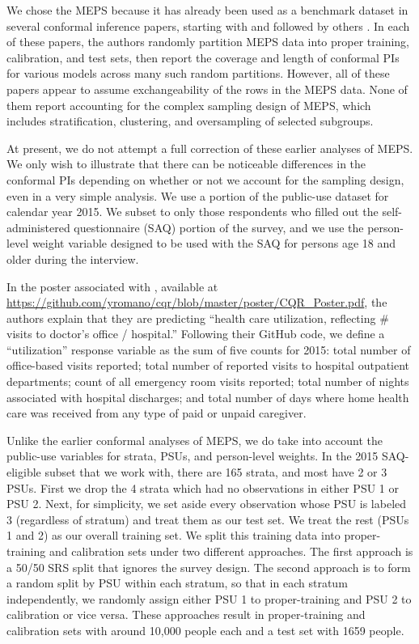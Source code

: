 \documentclass[10.5pt, letterpaper]{article}
\numberwithin{table}{section}
\numberwithin{figure}{section}
\numberwithin{equation}{section}
\begin{document}
We chose the MEPS because it has already been used as a benchmark dataset in several conformal inference papers, starting with \cite{romano2019conformalized} and followed by others \citep{sesia2020comparison, sesia2021conformal, feldman2021improving, bai2022efficient}. In each of these papers, the authors randomly partition MEPS data into proper training, calibration, and test sets, then report the coverage and length of conformal PIs for various models across many such random partitions.
However, all of these papers appear to assume exchangeability of the rows in the MEPS data. None of them report accounting for the complex sampling design of MEPS, which includes stratification, clustering, and oversampling of selected subgroups.

At present, we do not attempt a full correction of these earlier analyses of MEPS. We only wish to illustrate that there can be noticeable differences in the conformal PIs depending on whether or not we account for the sampling design, even in a very simple analysis. We use a portion of the public-use dataset for calendar year 2015. We subset to only those respondents who filled out the self-administered questionnaire (SAQ) portion of the survey, and we use the person-level weight variable designed to be used with the SAQ for persons age 18 and older during the interview.


In the poster associated with \cite{romano2019conformalized}, available at
\url{https://github.com/yromano/cqr/blob/master/poster/CQR_Poster.pdf},
the authors explain that they are predicting ``health care utilization, reflecting \# visits to doctor's office / hospital.''
Following their GitHub code, we define a ``utilization'' response variable as the sum of five counts for 2015:
total number of office-based visits reported;
total number of reported visits to hospital outpatient departments;
count of all emergency room visits reported;
total number of nights associated with hospital discharges; and
total number of days where home health care was received from any type of paid or unpaid caregiver.


Unlike the earlier conformal analyses of MEPS, we do take into account the public-use variables for strata, PSUs, and person-level weights. In the 2015 SAQ-eligible subset that we work with, there are 165 strata, and most have 2 or 3 PSUs. First we drop the 4 strata which had no observations in either PSU 1 or PSU 2. Next, for simplicity, we set aside every observation whose PSU is labeled 3 (regardless of stratum) and treat them as our test set. We treat the rest (PSUs 1 and 2) as our overall training set. We split this training data into proper-training and calibration sets under two different approaches. The first approach is a 50/50 SRS split that ignores the survey design. The second approach is to form a random split by PSU within each stratum, so that in each stratum independently, we randomly assign either PSU 1 to proper-training and PSU 2 to calibration or vice versa. These approaches result in proper-training and calibration sets with around 10,000 people each and a test set with 1659 people.
\end{document}
